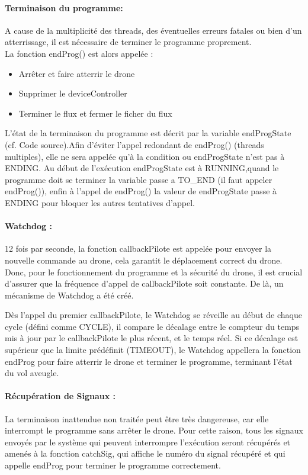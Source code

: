 \documentclass[12pt]{article}
\begin{document}
\paragraph*{Terminaison du programme:}
A cause de la multiplicité des threads, des éventuelles erreurs fatales ou bien d'un atterrissage, il est nécessaire de terminer le programme proprement.\\
La fonction endProg() est alors appelée : 
\begin{itemize}
    \item Arrêter et faire atterrir le drone
    \item Supprimer le deviceController
    \item Terminer le flux et fermer le ficher du flux
\end{itemize}
L'état de la terminaison du programme est décrit par la variable endProgState (cf. Code source\cite{git}).Afin d'éviter l'appel redondant de endProg() (threads multiples), elle ne sera appelée qu'à la condition ou endProgState n'est pas à ENDING. Au début de l'exécution endProgState est à RUNNING,quand le programme doit se terminer la variable passe a TO\_END (il faut appeler endProg()), enfin à l'appel de endProg() la valeur de endProgState passe à ENDING pour bloquer les autres tentatives d'appel.

\paragraph*{Watchdog :}
12 fois par seconde, la fonction callbackPilote est appelée pour envoyer la nouvelle commande au drone, cela garantit le déplacement correct du drone. Donc, pour le fonctionnement du programme et la sécurité du drone, il est crucial d'assurer que la fréquence d'appel de callbackPilote soit constante. De là, un mécanisme de Watchdog a été créé.

Dès l'appel du premier callbackPilote, le Watchdog se réveille au début de chaque cycle (défini comme CYCLE), il compare le décalage entre le compteur du temps mis à jour par le callbackPilote le plus récent, et le temps réel. Si ce décalage est supérieur que la limite prédéfinit (TIMEOUT), le Watchdog appellera la fonction endProg pour faire atterrir le drone et terminer le programme, terminant l'état du vol aveugle.

\paragraph*{Récupération de Signaux :}
La terminaison inattendue non traitée peut être très dangereuse, car elle interrompt le programme sans arrêter le drone. Pour cette raison, tous les signaux envoyés par le système qui peuvent interrompre l'exécution seront récupérés et amenés à la fonction catchSig, qui affiche le numéro du signal récupéré et qui appelle endProg pour terminer le programme correctement.
\end{document}
